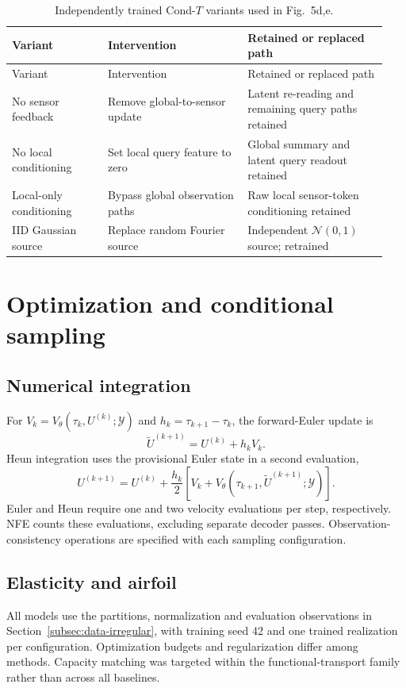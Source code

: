 \documentclass[11pt]{article}
\newcommand{\sisubsection}[1]{%
\FloatBarrier
\Needspace{5\baselineskip}%
\subsection{#1}%
}
\begin{document}
{\small
\begin{longtable}{@{}P{0.24\linewidth} P{0.35\linewidth} P{0.35\linewidth}@{}}
\caption{Independently trained Cond-$T$ variants used in Fig.~5d,e.}\label{tab:ablations}\\
\toprule Variant & Intervention & Retained or replaced path \\
\midrule\endfirsthead
\toprule Variant & Intervention & Retained or replaced path \\
\midrule\endhead
\bottomrule\endlastfoot
No sensor feedback & Remove global-to-sensor update & Latent re-reading and remaining query paths retained \\
No local conditioning & Set local query feature to zero & Global summary and latent query readout retained \\
Local-only conditioning & Bypass global observation paths & Raw local sensor-token conditioning retained \\
IID Gaussian source & Replace random Fourier source & Independent $\mathcal N(0,1)$ source; retrained \\
\end{longtable}
}

\FloatBarrier
{}
\section{Optimization and conditional sampling}
\label{sec:training}

\sisubsection{Numerical integration}
\label{subsec:integration}
For $V_k=V_\theta(\tau_k,U^{(k)};\mathcal Y)$ and $h_k=\tau_{k+1}-\tau_k$, the forward-Euler update is
\begin{equation}
 \widetilde U^{(k+1)}=U^{(k)}+h_kV_k.
 \label{eq:euler}
\end{equation}
Heun integration uses the provisional Euler state in a second evaluation,
\begin{equation}
 U^{(k+1)}=U^{(k)}+\frac{h_k}{2}
 \left[V_k+V_\theta(\tau_{k+1},\widetilde U^{(k+1)};\mathcal Y)\right].
 \label{eq:heun}
\end{equation}
Euler and Heun require one and two velocity evaluations per step, respectively. NFE counts these evaluations, excluding separate decoder passes. Observation-consistency operations are specified with each sampling configuration.

\sisubsection{Elasticity and airfoil}
\label{subsec:train-irregular}
All models use the partitions, normalization and evaluation observations in Section~\ref{subsec:data-irregular}, with training seed 42 and one trained realization per configuration. Optimization budgets and regularization differ among methods. Capacity matching was targeted within the functional-transport family rather than across all baselines.
\end{document}
